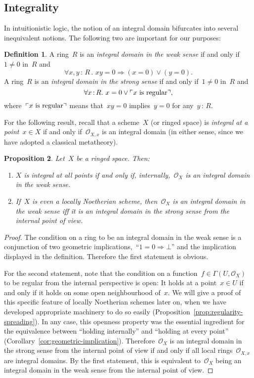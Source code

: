 \documentclass[10pt]{amsart}
\theoremstyle{definition}
\newtheorem{defn}{Definition}[section]
\theoremstyle{plain}
\newtheorem{prop}[defn]{Proposition}
\theoremstyle{remark}
\renewcommand{\O}{\mathcal{O}}
\newcommand{\?}{\,{:}\,}
\renewcommand{\_}{\mathpunct{.}\,}
\newcommand{\speak}[1]{\ulcorner\text{\textnormal{#1}}\urcorner}
\begin{document}
\subsection{Integrality} In intuitionistic logic, the notion of an integral
domain bifurcates into several inequivalent notions. The following two are
important for our purposes:
\begin{defn}A ring~$R$ is an \emph{integral domain in the weak sense} if and
only if~$1 \neq 0$ in~$R$ and
\[ \forall x,y\?R\_ xy = 0 \Longrightarrow (x = 0) \vee (y = 0). \]
A ring~$R$ is an \emph{integral domain in the strong sense} if and only if~$1
\neq 0$ in~$R$ and
\[ \forall x\?R\_ x = 0 \vee \speak{$x$ is regular}, \]
where~$\speak{$x$ is regular}$ means that~$xy = 0$ implies~$y = 0$ for any~$y \?
R$.\end{defn}

For the following result, recall that a scheme~$X$ (or ringed space) is
\emph{integral at a point~$x \in X$} if and only if~$\O_{X,x}$ is an integral
domain (in either sense, since we have adopted a classical metatheory).

\begin{prop}\label{prop:internal-integrality}
Let~$X$ be a ringed space. Then:
\begin{enumerate}
\item $X$ is integral at all points if and only if, internally,~$\O_X$ is an
integral domain in the weak sense.
\item If~$X$ is even a locally Noetherian scheme, then~$\O_X$ is an integral
domain in the weak sense iff it is an integral domain in the strong sense from
the internal point of view.
\end{enumerate}
\end{prop}
\begin{proof}The condition on a ring to be an integral domain in the weak sense
is a conjunction of two geometric implications,~``$1 = 0 \Rightarrow \bot$''
and the implication displayed in the definition. Therefore the first statement
is obvious.

For the second statement, note that the condition on a function~$f \in
\Gamma(U,\O_X)$ to be regular from the internal perspective is open: It holds
at a point~$x \in U$ if and only if it holds on some open neighbourhood of~$x$.
We will give a proof of this specific feature of locally Noetherian schemes
later on, when we have developed appropriate machinery to do so easily
(Proposition~\ref{prop:regularity-spreading}). In any case, this openness
property was the essential ingredient for the equivalence between ``holding
internally'' and ``holding at every point''
(Corollary~\ref{cor:geometric-implication}). Therefore~$\O_X$ is an integral
domain in the strong sense from the internal point of view if and only if all
local rings~$\O_{X,x}$ are integral domains. By the first statement, this is
equivalent to~$\O_X$ being an integral domain in the weak sense from the
internal point of view.
\end{proof}
\end{document}

